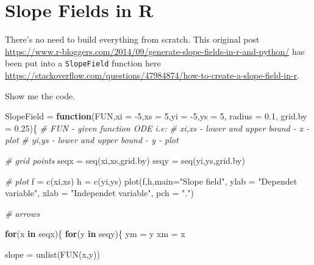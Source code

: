 \documentclass[
]{book}
\newenvironment{Shaded}{\begin{snugshade}}{\end{snugshade}}
\newcommand{\AttributeTok}[1]{\textcolor[rgb]{0.77,0.63,0.00}{#1}}
\newcommand{\CommentTok}[1]{\textcolor[rgb]{0.56,0.35,0.01}{\textit{#1}}}
\newcommand{\ControlFlowTok}[1]{\textcolor[rgb]{0.13,0.29,0.53}{\textbf{#1}}}
\newcommand{\DecValTok}[1]{\textcolor[rgb]{0.00,0.00,0.81}{#1}}
\newcommand{\FloatTok}[1]{\textcolor[rgb]{0.00,0.00,0.81}{#1}}
\newcommand{\FunctionTok}[1]{\textcolor[rgb]{0.00,0.00,0.00}{#1}}
\newcommand{\NormalTok}[1]{#1}
\newcommand{\OtherTok}[1]{\textcolor[rgb]{0.56,0.35,0.01}{#1}}
\newcommand{\SpecialCharTok}[1]{\textcolor[rgb]{0.00,0.00,0.00}{#1}}
\newcommand{\StringTok}[1]{\textcolor[rgb]{0.31,0.60,0.02}{#1}}
\begin{document}
\hypertarget{slope-fields-in-r}{%
\section{Slope Fields in R}\label{slope-fields-in-r}}

There's no need to build everything from scratch. This original post \url{https://www.r-bloggers.com/2014/09/generate-slope-fields-in-r-and-python/} has been put into a \texttt{SlopeField} function here \url{https://stackoverflow.com/questions/47984874/how-to-create-a-slope-field-in-r}.

Show me the code.

\begin{Shaded}
\begin{Highlighting}[]
\NormalTok{SlopeField }\OtherTok{=} \ControlFlowTok{function}\NormalTok{(FUN,}\AttributeTok{xi =} \SpecialCharTok{{-}}\DecValTok{5}\NormalTok{,}\AttributeTok{xs =} \DecValTok{5}\NormalTok{,}\AttributeTok{yi =} \SpecialCharTok{{-}}\DecValTok{5}\NormalTok{,}\AttributeTok{ys =} \DecValTok{5}\NormalTok{, }\AttributeTok{radius =} \FloatTok{0.1}\NormalTok{, }\AttributeTok{grid.by =} \FloatTok{0.25}\NormalTok{)\{}
  \CommentTok{\# FUN   {-} given function ODE i.e:  }
  \CommentTok{\# xi,xs {-} lower and upper bound {-} x {-} plot}
  \CommentTok{\# yi,ys {-} lower and upper bound {-} y {-} plot}
  
  \CommentTok{\# grid points}
\NormalTok{  seqx }\OtherTok{=} \FunctionTok{seq}\NormalTok{(xi,xs,grid.by)}
\NormalTok{  seqy }\OtherTok{=} \FunctionTok{seq}\NormalTok{(yi,ys,grid.by)}
  
  \CommentTok{\# plot}
\NormalTok{  f }\OtherTok{=} \FunctionTok{c}\NormalTok{(xi,xs) }
\NormalTok{  h }\OtherTok{=} \FunctionTok{c}\NormalTok{(yi,ys)}
  \FunctionTok{plot}\NormalTok{(f,h,}\AttributeTok{main=}\StringTok{"Slope field"}\NormalTok{, }\AttributeTok{ylab =} \StringTok{"Dependet variable"}\NormalTok{, }\AttributeTok{xlab =} \StringTok{"Independet variable"}\NormalTok{, }\AttributeTok{pch =} \StringTok{"."}\NormalTok{)}
  
  \CommentTok{\# arrows}
  
  \ControlFlowTok{for}\NormalTok{(x }\ControlFlowTok{in}\NormalTok{ seqx)\{}
    \ControlFlowTok{for}\NormalTok{(y }\ControlFlowTok{in}\NormalTok{ seqy)\{}
\NormalTok{      ym }\OtherTok{=}\NormalTok{ y}
\NormalTok{      xm }\OtherTok{=}\NormalTok{ x}
      
\NormalTok{      slope }\OtherTok{=} \FunctionTok{unlist}\NormalTok{(}\FunctionTok{FUN}\NormalTok{(x,y))}
      

\end{Highlighting}
\end{Shaded}
\end{document}
